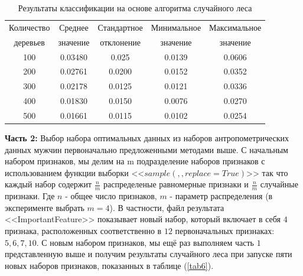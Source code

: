 \begin{table}[b!]%
\begin{center}
\caption{Результаты классификации на основе алгоритма случайного леса \cite{long1,long2}}\label{tab5}
  \begin{tabular}{|c|c|c|c|c|}
    \hline
 Количество  & Среднее   &   Стандартное   & Минимальное   & Максимальное \\
деревьев     & значение  &    отклонение   & значение      &значение      \\
\hline
100 &	0.03480	&0.025&	0.0139&	0.0606\\
\hline
200 &	0.02761	&0.0200	&0.0152	&0.0352\\
\hline
300	&0.02178	&0.0125	&0.0121	&0.0336\\
\hline
400	&0.01830	&0.0150	&0.0076	&0.0270\\
\hline
500	&0.01661	&0.0115	&0.0102	&0.0254\\
\hline

  \end{tabular}
\end{center}
\end{table}%

\textbf{Часть 2:} Выбор набора оптимальных данных из наборов антропометрических данных мужчин первоначально предложенными методами выше. С начальным набором признаков, мы делим на m подразделение наборов признаков с использованием функции выборки <<$sample\left(, ,replace=True\right)$>> так что каждый набор содержит $\frac{n}{m}$ распределеные равномерные признаки и $\frac{n}{m}$ случайные признаки. Где $n$ - общее число признаков, $m$ - параметр распределения (в эксперименте выбрать $m=4$). В частности, файл результата <<ImportantFeature>> показывает новый набор, который включает в себя $4$ признака, расположенных соответственно в $12$ первоначальных признаках: $5,6,7,10$. С новым набором признаков, мы ещё раз выполняем часть $1$ представленную выше и получим результаты случайного леса при запуске пяти новых наборов признаков, показанных в таблице (\ref{tab6}).

